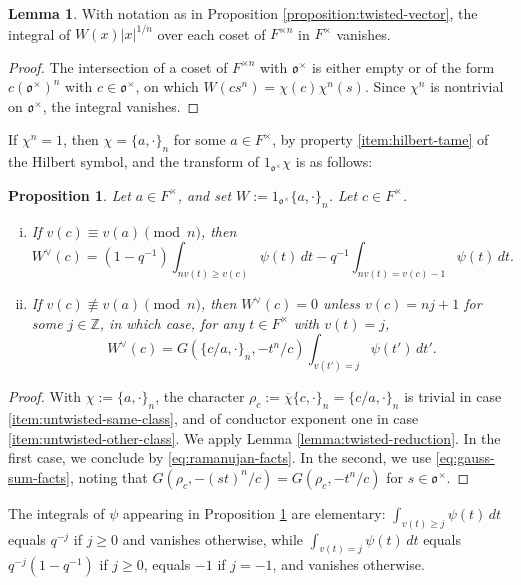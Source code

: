 \documentclass[reqno]{amsart}
\theoremstyle{plain}
\newtheorem{proposition}[theorem]{Proposition}
\theoremstyle{definition}
\theoremstyle{itplain}
\newtheorem{lemma}[theorem]{Lemma}
\numberwithin{equation}{section}
\numberwithin{theorem}{section}
\begin{document}
\begin{lemma}\label{lemma:twisted-vanishing}
  With notation as in Proposition \ref{proposition:twisted-vector}, the integral of $W(x) \lvert x \rvert^{1/n}$ over each coset of $F^{\times n}$ in $F^\times$ vanishes.
\end{lemma}
\begin{proof}
  The intersection of a coset of $F^{\times n}$ with $\mathfrak{o}^\times$ is either empty or of the form $c (\mathfrak{o}^\times)^n$ with $c \in \mathfrak{o}^\times$, on which $W(c s^n) = \chi(c) \chi^n(s)$.  Since $\chi^n$ is nontrivial on $\mathfrak{o}^\times$, the integral vanishes.
\end{proof}

If $\chi^n = 1$, then $\chi = \{a, \cdot\}_n$ for some $a \in F^\times$, by property \eqref{item:hilbert-tame} of the Hilbert symbol, and the transform of \(1_{\mathfrak o^\times}\chi\) is as follows:

\begin{proposition}\label{proposition:untwisted-vector}
  Let $a \in F^\times$, and set $W := 1_{\mathfrak{o}^\times} \{a, \cdot\}_n$.  Let $c \in F^\times$.
  \begin{enumerate}[(i)]
  \item\label{item:untwisted-same-class} If $v(c) \equiv v(a) \pmod{n}$, then
    \begin{equation*}
      W^\vee(c) = (1 - q^{-1}) \int_{n v(t) \geq v(c)} \psi(t) \, d t - q^{-1} \int_{n v(t) = v(c) - 1} \psi(t) \, d t.
    \end{equation*}
  \item\label{item:untwisted-other-class} If $v(c) \not\equiv v(a) \pmod{n}$, then $W^\vee(c) = 0$ unless $v(c) = n j + 1$ for some $j \in \mathbb{Z}$, in which case, for any $t \in F^\times$ with $v(t) = j$,
    \begin{equation*}
      W^\vee(c) = G(\{c/a, \cdot\}_n, - t^n / c) \int_{v(t') = j} \psi(t') \, d t'.
    \end{equation*}
  \end{enumerate}
\end{proposition}
\begin{proof}
  With $\chi := \{a, \cdot\}_n$, the character $\rho_c := \overline{\chi} \{c, \cdot\}_n = \{c / a, \cdot\}_n$ is trivial in case \eqref{item:untwisted-same-class}, and of conductor exponent one in case \eqref{item:untwisted-other-class}.  We apply Lemma \ref{lemma:twisted-reduction}.  In the first case, we conclude by \eqref{eq:ramanujan-facts}.  In the second, we use \eqref{eq:gauss-sum-facts}, noting that $G(\rho_c, - (s t)^n / c) = G(\rho_c, - t^n / c)$ for $s \in \mathfrak{o}^\times$.
\end{proof}
The integrals of $\psi$ appearing in Proposition \ref{proposition:untwisted-vector} are elementary: $\int_{v(t) \geq j} \psi(t) \, d t$ equals $q^{-j}$ if $j \geq 0$ and vanishes otherwise, while $\int_{v(t) = j} \psi(t) \, d t$ equals $q^{-j} (1 - q^{-1})$ if $j \geq 0$, equals $-1$ if $j = -1$, and vanishes otherwise.
\end{document}
